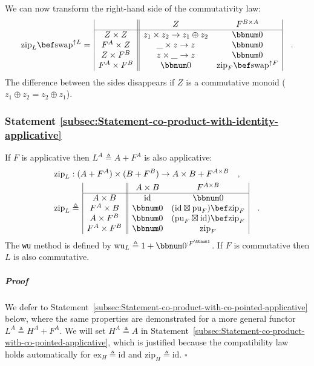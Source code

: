 We can now transform the right-hand side of the commutativity law:
\[
\text{zip}_{L}\bef\text{swap}^{\uparrow L}=\,\begin{array}{|c||cc|}
 & Z & F^{B\times A}\\
\hline Z\times Z & z_{1}\times z_{2}\rightarrow z_{1}\oplus z_{2} & \bbnum 0\\
F^{A}\times Z & \_\times z\rightarrow z & \bbnum 0\\
Z\times F^{B} & z\times\_\rightarrow z & \bbnum 0\\
F^{A}\times F^{B} & \bbnum 0 & \text{zip}_{F}\bef\text{swap}^{\uparrow F}
\end{array}\quad.
\]
The difference between the sides disappears if $Z$ is a commutative
monoid ($z_{1}\oplus z_{2}=z_{2}\oplus z_{1}$). 

\subsubsection{Statement \label{subsec:Statement-co-product-with-identity-applicative}\ref{subsec:Statement-co-product-with-identity-applicative}}

If $F$ is applicative then $L^{A}\triangleq A+F^{A}$ is also applicative:
\begin{align*}
 & \text{zip}_{L}:(A+F^{A})\times(B+F^{B})\rightarrow A\times B+F^{A\times B}\quad,\\
 & \text{zip}_{L}\triangleq\,\begin{array}{|c||cc|}
 & A\times B & F^{A\times B}\\
\hline A\times B & \text{id} & \bbnum 0\\
F^{A}\times B & \bbnum 0 & (\text{id}\boxtimes\text{pu}_{F})\bef\text{zip}_{F}\\
A\times F^{B} & \bbnum 0 & (\text{pu}_{F}\boxtimes\text{id})\bef\text{zip}_{F}\\
F^{A}\times F^{B} & \bbnum 0 & \text{zip}_{F}
\end{array}\quad.
\end{align*}
The \lstinline!wu! method is defined by $\text{wu}_{L}\triangleq1+\bbnum 0^{:F^{\bbnum 1}}$.
If $F$ is commutative then $L$ is also commutative.

\subparagraph{Proof}

We defer to Statement~\ref{subsec:Statement-co-product-with-co-pointed-applicative}
below, where the same properties are demonstrated for a more general
functor $L^{A}\triangleq H^{A}+F^{A}$. We will set $H^{A}\triangleq A$
in Statement~\ref{subsec:Statement-co-product-with-co-pointed-applicative},
which is justified because the compatibility law holds automatically
for $\text{ex}_{H}\triangleq\text{id}$ and $\text{zip}_{H}\triangleq\text{id}$.
 $\square$

